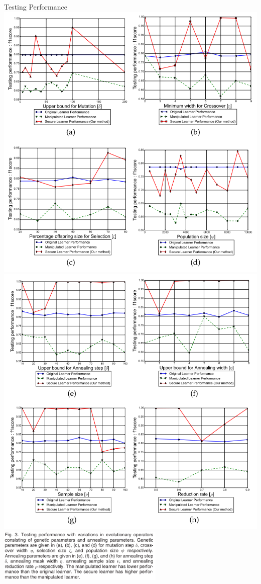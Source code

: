 \documentclass[10pt]{beamer}
\begin{document}
\begin{frame}{Testing Performance}
    \includegraphics[scale=0.2]{images/Fig3abcd.png}
    \includegraphics[scale=0.2]{images/Fig3defg.png}
    \includegraphics[width=8cm]{images/Fig3text.png}
\end{frame}
\end{document}
